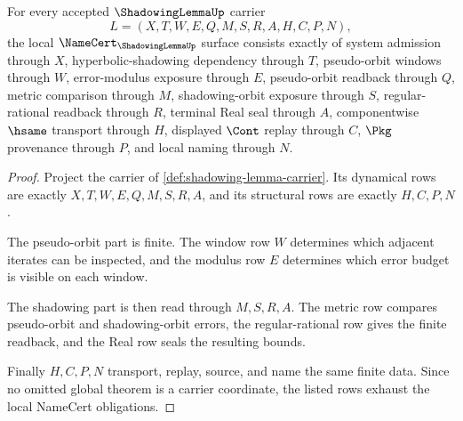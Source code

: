 \begin{theorem}
\label{thm:shadowing-lemma-namecert-obligations}
For every accepted $\ShadowingLemmaUp$ carrier
$$
L=(X,T,W,E,Q,M,S,R,A,H,C,P,N),
$$
the local $\NameCert_{\ShadowingLemmaUp}$ surface consists exactly of system admission through $X$, hyperbolic-shadowing dependency through $T$, pseudo-orbit windows through $W$, error-modulus exposure through $E$, pseudo-orbit readback through $Q$, metric comparison through $M$, shadowing-orbit exposure through $S$, regular-rational readback through $R$, terminal Real seal through $A$, componentwise $\hsame$ transport through $H$, displayed $\Cont$ replay through $C$, $\Pkg$ provenance through $P$, and local naming through $N$.
\end{theorem}
\begin{proof}
Project the carrier of \autoref{def:shadowing-lemma-carrier}. Its dynamical rows are exactly $X,T,W,E,Q,M,S,R,A$, and its structural rows are exactly $H,C,P,N$.

The pseudo-orbit part is finite. The window row $W$ determines which adjacent iterates can be inspected, and the modulus row $E$ determines which error budget is visible on each window.

The shadowing part is then read through $M,S,R,A$. The metric row compares pseudo-orbit and shadowing-orbit errors, the regular-rational row gives the finite readback, and the Real row seals the resulting bounds.

Finally $H,C,P,N$ transport, replay, source, and name the same finite data. Since no omitted global theorem is a carrier coordinate, the listed rows exhaust the local NameCert obligations.
\end{proof}

